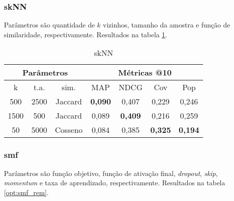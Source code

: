 \subsubsection{skNN}
Parâmetros são quantidade de $k$ vizinhos, tamanho da amostra e função de
similaridade, respectivamente. Resultados na tabela \ref{opt:skNN_rem}.
\begin{table}[htbp]
  \centering
  \begin{tabular}{|c|c|c|c|c|c|c|}
    \hline
      \multicolumn{3}{|c|}{Parâmetros} & \multicolumn{4}{c|}{Métricas @10} \\
      \hline
      k & t.a. & sim. & MAP & NDCG & Cov & Pop \\
      \hline
      500 & 2500 & Jaccard & \textbf{0,090} & 0,407 & 0,229 & 0,246 \\
      \hline
      1500 & 500 & Jaccard & 0,089 & \textbf{0,409} & 0,216 & 0,259 \\
      \hline
      50 & 5000 & Cosseno & 0,084 & 0,385 & \textbf{0,325} & \textbf{0,194} \\
      \hline
\end{tabular}
      \caption{skNN}
      \label{opt:skNN_rem}
\end{table}

\subsubsection{smf}
Parâmetros são função objetivo, função de ativação final, \textit{dropout},
\textit{skip}, \textit{momentum} e taxa de aprendizado, respectivamente.
Resultados na tabela \ref{opt:smf_rem}.

